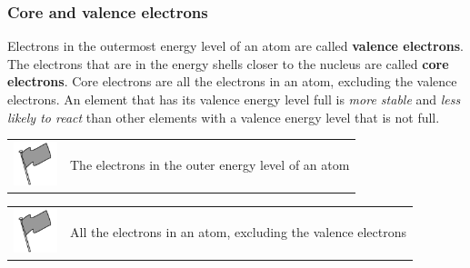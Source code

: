             \subsubsection{ Core and valence electrons}
            \nopagebreak
        \label{m38741*id259935}Electrons in the outermost energy level of an atom are called \textbf{valence electrons}. The electrons that are in the energy shells closer to the nucleus are called \textbf{core electrons}. Core electrons are all the electrons in an atom, excluding the valence electrons. An element that has its valence energy level full is \textsl{more stable} and \textsl{less likely to react} than other elements with a valence energy level that is not full.\par 
\label{m38741*fhsst!!!underscore!!!id755}\begin{definition}
	  \begin{tabular*}{15 cm}{m{15 mm}m{}}
	\hspace*{-50pt}  \includegraphics[width=0.5in]{col11305.imgs/psflag2.png}   & \Definition{   \label{id2421518}\textbf{ Valence electrons }} { \label{m38741*meaningfhsst!!!underscore!!!id755}
        \label{m38741*id259971}The electrons in the outer energy level of an atom \par 
         } 
      \end{tabular*}
      \end{definition}
\label{m38741*fhsst!!!underscore!!!id758}\begin{definition}
	  \begin{tabular*}{15 cm}{m{15 mm}m{}}
	\hspace*{-50pt}  \includegraphics[width=0.5in]{col11305.imgs/psflag2.png}   & \Definition{   \label{id2421542}\textbf{ Core electrons }} { \label{m38741*meaningfhsst!!!underscore!!!id758}
        \label{m38741*id259989}All the electrons in an atom, excluding the valence electrons \par 
         } 
      \end{tabular*}
      \end{definition}
      \label{m38741*uid105}
